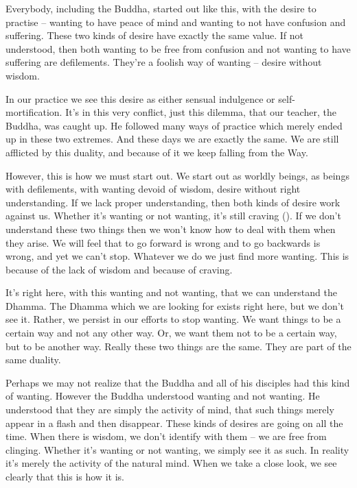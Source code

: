 Everybody, including the Buddha, started out like this, with the desire to practise -- wanting to have peace of mind and wanting to not have confusion and suffering. These two kinds of desire have exactly the same value. If not understood, then both wanting to be free from confusion and not wanting to have suffering are defilements. They're a foolish way of wanting -- desire without wisdom. 

In our practice we see this desire as either sensual indulgence or self-mortification. It's in this very conflict, just this dilemma, that our teacher, the Buddha, was caught up. He followed many ways of practice which merely ended up in these two extremes. And these days we are exactly the same. We are still afflicted by this duality, and because of it we keep falling from the Way. 

However, this is how we must start out. We start out as worldly beings, as beings with defilements, with wanting devoid of wisdom, desire without right understanding. If we lack proper understanding, then both kinds of desire work against us. Whether it's wanting or not wanting, it's still craving (). If we don't understand these two things then we won't know how to deal with them when they arise. We will feel that to go forward is wrong and to go backwards is wrong, and yet we can't stop. Whatever we do we just find more wanting. This is because of the lack of wisdom and because of craving. 

It's right here, with this wanting and not wanting, that we can understand the Dhamma. The Dhamma which we are looking for exists right here, but we don't see it. Rather, we persist in our efforts to stop wanting. We want things to be a certain way and not any other way. Or, we want them not to be a certain way, but to be another way. Really these two things are the same. They are part of the same duality. 

Perhaps we may not realize that the Buddha and all of his disciples had this kind of wanting. However the Buddha understood wanting and not wanting. He understood that they are simply the activity of mind, that such things merely appear in a flash and then disappear. These kinds of desires are going on all the time. When there is wisdom, we don't identify with them -- we are free from clinging. Whether it's wanting or not wanting, we simply see it as such. In reality it's merely the activity of the natural mind. When we take a close look, we see clearly that this is how it is. 

